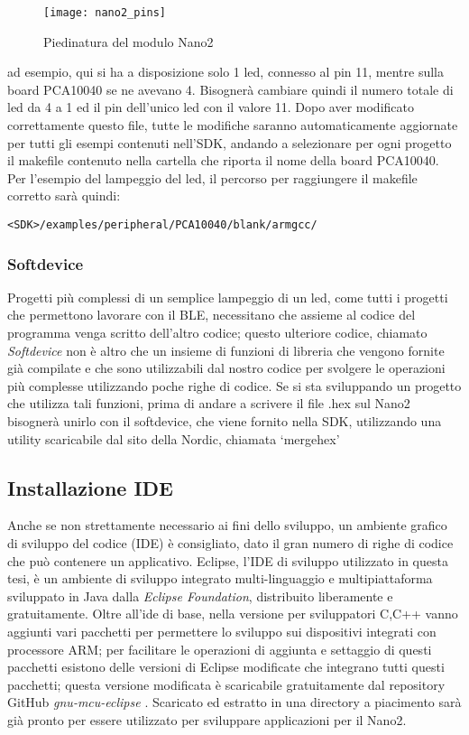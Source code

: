 \begin{figure}[H]
\texttt{[image: nano2\_pins]}
\centering
\caption{Piedinatura del modulo Nano2}
\label{nano2_pins}
\end{figure}
ad esempio, qui si ha a disposizione solo 1 led, connesso al pin 11, mentre sulla board PCA10040 se ne avevano 4. Bisognerà cambiare quindi il numero totale di led da 4 a 1 ed il pin dell'unico led con il valore 11.
Dopo aver modificato correttamente questo file, tutte le modifiche saranno automaticamente aggiornate per tutti gli esempi contenuti nell'SDK, andando a selezionare per ogni progetto il makefile contenuto nella cartella che riporta il nome della board PCA10040.
Per l'esempio del lampeggio del led, il percorso per raggiungere il makefile corretto sarà quindi:

\begin{verbatim}
<SDK>/examples/peripheral/PCA10040/blank/armgcc/
\end{verbatim}

\subsubsection{Softdevice}
Progetti più complessi di un semplice lampeggio di un led, come tutti i progetti che permettono lavorare con il BLE, necessitano che assieme al codice del programma venga scritto dell'altro codice; questo ulteriore codice, chiamato \emph{Softdevice} non è altro che un insieme di funzioni di libreria che vengono fornite già compilate e che sono utilizzabili dal nostro codice per svolgere le operazioni più complesse utilizzando poche righe di codice.
Se si sta sviluppando un progetto che utilizza tali funzioni, prima di andare a scrivere il file .hex sul Nano2 bisognerà unirlo con il softdevice, che viene fornito nella SDK, utilizzando una utility scaricabile dal sito della Nordic, chiamata \lq mergehex\rq

\subsection{Installazione IDE}
Anche se non strettamente necessario ai fini dello sviluppo, un ambiente grafico di sviluppo del codice (IDE) è consigliato, dato il gran numero di righe di codice che può contenere un applicativo. Eclipse, l'IDE di sviluppo utilizzato in questa tesi, è un ambiente di sviluppo integrato multi-linguaggio e multipiattaforma sviluppato in Java dalla \emph{Eclipse Foundation}, distribuito liberamente e gratuitamente.
Oltre all'ide di base, nella versione per sviluppatori C,C++ vanno aggiunti vari pacchetti per permettere lo sviluppo sui dispositivi integrati con processore ARM; per facilitare le operazioni di aggiunta e settaggio di questi pacchetti esistono delle versioni di Eclipse modificate che integrano tutti questi pacchetti; questa versione modificata è scaricabile gratuitamente dal repository GitHub \emph{gnu-mcu-eclipse} \cite{gnueclipseweb}. Scaricato ed estratto in una directory a piacimento sarà già pronto per essere utilizzato per sviluppare applicazioni per il Nano2.
